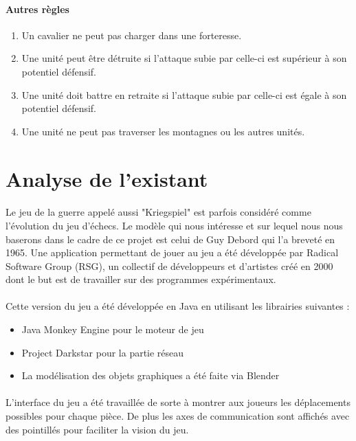 \documentclass[12pt]{article}
\begin{document}
		\paragraph{Autres règles}
		\begin{enumerate}
		\item Un cavalier ne peut pas charger dans une forteresse.
		\item Une unité peut être détruite si l'attaque subie par celle-ci est supérieur à son potentiel défensif.
		\item Une unité doit battre en retraite si l'attaque subie par celle-ci est égale à son potentiel défensif.
		\item Une unité ne peut pas traverser les montagnes ou les autres unités.
		\end{enumerate}
		\clearpage

	\section{Analyse de l'existant}    

		\paragraph{}
		Le jeu de la guerre appelé aussi "Kriegspiel" est parfois considéré comme l'évolution du jeu d'échecs.
		Le modèle qui nous intéresse et sur lequel nous nous baserons dans le cadre de ce projet est celui de Guy Debord qui l'a breveté en 1965.
		Une application permettant de jouer au jeu a été développée par Radical Software Group (RSG), un collectif de développeurs et d'artistes 
		créé en 2000 dont le but est de travailler sur des programmes expérimentaux.
		
		\paragraph{}
		Cette version du jeu a été développée en Java en utilisant les librairies suivantes :
		
		\begin{itemize}
			\item Java Monkey Engine pour le moteur de jeu
			\item Project Darkstar pour la partie réseau
			\item La modélisation des objets graphiques a été faite via Blender
		\end{itemize}

		\paragraph{}
		L'interface du jeu a été travaillée de sorte à montrer aux joueurs les déplacements possibles pour chaque pièce. De plus les axes de 
		communication sont affichés avec des pointillés pour faciliter la vision du jeu.
		
\end{document}
